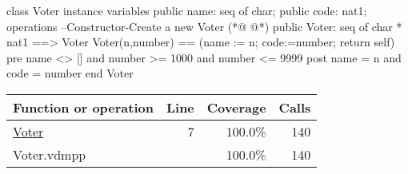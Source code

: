 \begin{vdmpp}
class Voter
instance variables
 public name: seq of char;
 public code: nat1;
operations
--Constructor-Create a new Voter
(*@
\label{Voter:7}
@*)
 public Voter: seq of char * nat1 ==> Voter
 Voter(n,number) == (name := n;
           code:=number; 
           return self)
 pre 
  name <> [] and
  number >= 1000 and
  number <= 9999
 post 
  name = n and
  code = number
end Voter
\end{vdmpp}
\bigskip
\begin{longtable}{|l|r|r|r|}
\hline
Function or operation & Line & Coverage & Calls \\
\hline
\hline
\hyperref[Voter:7]{Voter} & 7&100.0\% & 140 \\
\hline
\hline
Voter.vdmpp & & 100.0\% & 140 \\
\hline
\end{longtable}


